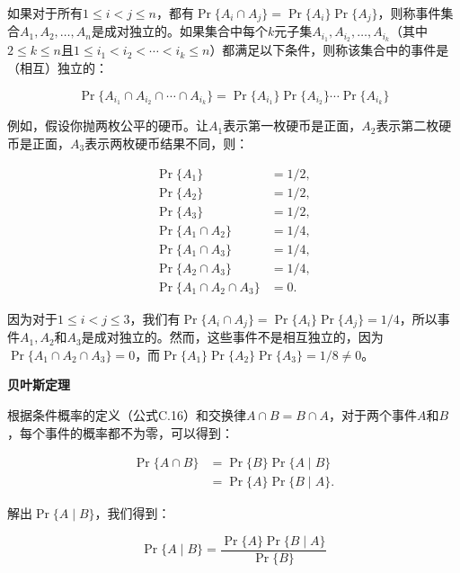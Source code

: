 \documentclass[lang=cn,newtx,10pt,scheme=chinese]{elegantbook}
\begin{document}
如果对于所有$1 \leq i<j \leq n$，都有$\operatorname{Pr}\{A_i \cap A_j\}=\operatorname{Pr}\{A_i\} \operatorname{Pr}\{A_j\}$，则称事件集合$A_1, A_2, \ldots, A_n$是成对独立的。如果集合中每个$k$元子集$A_{i_1}, A_{i_2}, \ldots, A_{i_k}$（其中$2 \leq k \leq n$且$1 \leq i_1<i_2<\cdots<i_k \leq n$）都满足以下条件，则称该集合中的事件是（相互）独立的：

$$
\operatorname{Pr}\{A_{i_1} \cap A_{i_2} \cap \cdots \cap A_{i_k}\}=\operatorname{Pr}\{A_{i_1}\} \operatorname{Pr}\{A_{i_2}\} \cdots \operatorname{Pr}\{A_{i_k}\}
$$

例如，假设你抛两枚公平的硬币。让$A_1$表示第一枚硬币是正面，$A_2$表示第二枚硬币是正面，$A_3$表示两枚硬币结果不同，则：

$$
\begin{aligned}
\operatorname{Pr}\{A_1\} & =1 / 2, \\
\operatorname{Pr}\{A_2\} & =1 / 2, \\
\operatorname{Pr}\{A_3\} & =1 / 2, \\
\operatorname{Pr}\{A_1 \cap A_2\} & =1 / 4, \\
\operatorname{Pr}\{A_1 \cap A_3\} & =1 / 4, \\
\operatorname{Pr}\{A_2 \cap A_3\} & =1 / 4, \\
\operatorname{Pr}\{A_1 \cap A_2 \cap A_3\} & =0 .
\end{aligned}
$$

因为对于$1 \leq i<j \leq 3$，我们有$\operatorname{Pr}\{A_i \cap A_j\}=\operatorname{Pr}\{A_i\} \operatorname{Pr}\{A_j\}=1 / 4$，所以事件$A_1, A_2$和$A_3$是成对独立的。然而，这些事件不是相互独立的，因为$\operatorname{Pr}\{A_1 \cap A_2 \cap A_3\}=0$，而$\operatorname{Pr}\{A_1\} \operatorname{Pr}\{A_2\} \operatorname{Pr}\{A_3\}=1 / 8 \neq 0$。

\textbf{贝叶斯定理}

根据条件概率的定义（公式C.16）和交换律$A \cap B=B \cap A$，对于两个事件$A$和$B$，每个事件的概率都不为零，可以得到：

$$
\begin{aligned}
\operatorname{Pr}\{A \cap B\} & =\operatorname{Pr}\{B\} \operatorname{Pr}\{A \mid B\} \\
& =\operatorname{Pr}\{A\} \operatorname{Pr}\{B \mid A\} .
\end{aligned}
$$

解出$\operatorname{Pr}\{A \mid B\}$，我们得到：

$$
\operatorname{Pr}\{A \mid B\}=\frac{\operatorname{Pr}\{A\} \operatorname{Pr}\{B \mid A\}}{\operatorname{Pr}\{B\}}
$$
\end{document}
